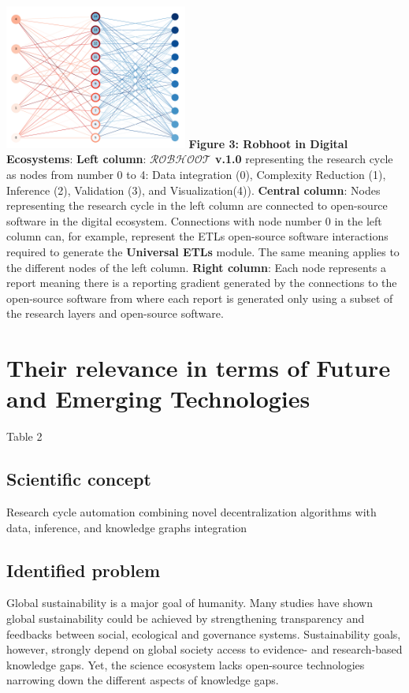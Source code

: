 \documentclass[12pt, a4paper]{article} %
\begin{document}
  \includegraphics[width=0.45\textwidth]{Figures/FigureRobhoot.pdf}
  {\small {\bf Figure 3: Robhoot in Digital Ecosystems}: {\bf Left
      column}: {\bf $\mathcal{ROBHOOT}$ v.1.0} representing the
    research cycle as nodes from number 0 to 4: Data integration (0),
    Complexity Reduction (1), Inference (2), Validation (3), and
    Visualization(4)). {\bf Central column}: Nodes representing the
    research cycle in the left column are connected to open-source
    software in the digital ecosystem. Connections with node number 0
    in the left column can, for example, represent the ETLs
    open-source software interactions required to generate the {\bf
      Universal ETLs} module. The same meaning applies to the
    different nodes of the left column. {\bf Right column}: Each node
    represents a report meaning there is a reporting gradient
    generated by the connections to the open-source software from
    where each report is generated only using a subset of the research
    layers and open-source software.}


\section{Their relevance in terms of Future and Emerging Technologies}

Table 2 


\subsection{Scientific concept}
Research cycle automation combining novel decentralization algorithms
with data, inference, and knowledge graphs integration

\subsection{Identified problem}
Global sustainability  is a major goal of humanity. Many studies have
shown global sustainability could be achieved by strengthening
transparency and feedbacks between social, ecological and governance
systems. Sustainability goals, however, strongly depend on global
society access to evidence- and research-based knowledge gaps. Yet,
the science ecosystem lacks open-source technologies narrowing down
the different aspects of knowledge gaps.
\end{document}
